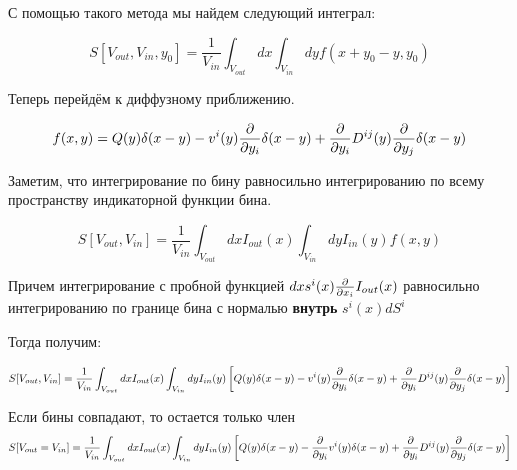 С помощью такого метода мы найдем следующий интеграл:

\begin{equation*}
	S[V_{out},V_{in}, y_0] = \frac{1}{V_{in}}\int_{V_{out}}{dx\int_{V_{in}}{dy f(x + y_0 - y,y_0)}}
\end{equation*}


Теперь перейдём к диффузному приближению.

\begin{equation*}
	f(x,y) = Q(y)\delta(x-y) -  v^i(y) \frac{\partial }{\partial y_i} \delta(x-y) + \frac{\partial }{\partial y_i} D^{ij}(y) \frac{\partial }{\partial y_j} \delta(x-y)
\end{equation*}

Заметим, что интегрирование по бину равносильно интегрированию по всему пространству индикаторной функции бина.

\begin{equation*}
	S[V_{out},V_{in}] = \frac{1}{V_{in}}\int_{V_{out}}{dx I_{out}(x)\int_{V_{in}}{dy I_{in}(y)f(x,y)}}
\end{equation*}

Причем интегрирование с пробной функцией $dx s^{i}(x)\frac{\partial }{\partial x_i} I_{out}(x)$ равносильно интегрированию по границе бина с нормалью \textbf{внутрь} $s^{i}(x) dS^i$

Тогда получим:

\begin{equation*}
	S[V_{out},V_{in}] = \frac{1}{V_{in}}\int_{V_{out}}{dx I_{out}(x)\int_{V_{in}}{dy I_{in}(y)
		\left[ Q(y)\delta(x-y) -  v^i(y) \frac{\partial }{\partial y_i} \delta(x-y) + \frac{\partial }{\partial y_i} D^{ij}(y) \frac{\partial }{\partial y_j} \delta(x-y) \right] 
	}}
\end{equation*}


Если бины совпадают, то остается только член 
\begin{equation*}
	S[V_{out} = V_{in}] = \frac{1}{V_{in}}\int_{V_{out}}{dx I_{out}(x)\int_{V_{in}}{dy I_{in}(y)
			\left[ Q(y)\delta(x-y) - \frac{\partial }{\partial y_i} v^i(y) \delta(x-y) + \frac{\partial }{\partial y_i} D^{ij}(y) \frac{\partial }{\partial y_j} \delta(x-y) \right] 
	}}
\end{equation*}